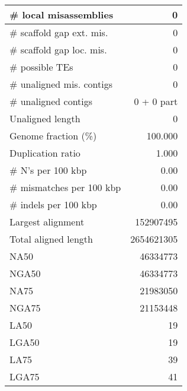 \documentclass[12pt,a4paper]{article}
\begin{document}
\begin{table}[ht]
\begin{center}
\begin{tabular}{|l*{1}{|r}|}
\# local misassemblies & 0 \\ \hline
\# scaffold gap ext. mis. & 0 \\ \hline
\# scaffold gap loc. mis. & 0 \\ \hline
\# possible TEs & 0 \\ \hline
\# unaligned mis. contigs & 0 \\ \hline
\# unaligned contigs & 0 + 0 part \\ \hline
Unaligned length & 0 \\ \hline
Genome fraction (\%) & 100.000 \\ \hline
Duplication ratio & 1.000 \\ \hline
\# N's per 100 kbp & 0.00 \\ \hline
\# mismatches per 100 kbp & 0.00 \\ \hline
\# indels per 100 kbp & 0.00 \\ \hline
Largest alignment & 152907495 \\ \hline
Total aligned length & 2654621305 \\ \hline
NA50 & 46334773 \\ \hline
NGA50 & 46334773 \\ \hline
NA75 & 21983050 \\ \hline
NGA75 & 21153448 \\ \hline
LA50 & 19 \\ \hline
LGA50 & 19 \\ \hline
LA75 & 39 \\ \hline
LGA75 & 41 \\ \hline
\end{tabular}
\end{center}
\end{table}
\end{document}
